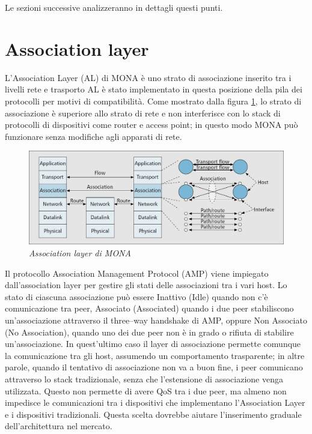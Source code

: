 \documentclass[12pt,a4paper,openright,twoside,draft]{book}
\begin{document}
Le sezioni successive analizzeranno in dettagli questi punti.

\section{Association layer}

L'Association Layer (AL) di MONA è uno strato di associazione inserito
tra i livelli rete e trasporto AL è stato implementato in questa
posizione della pila dei protocolli per motivi di compatibilità. Come
mostrato dalla figura \ref{fig:mona-association-layer}, lo strato di
associazione è superiore allo strato di rete e non interferisce con lo
stack di protocolli di dispositivi come router e access point; in
questo modo MONA può funzionare senza modifiche agli apparati di rete.

\begin{figure}
\centering
\includegraphics[width=\textwidth]{img/mona-association-layer}
\caption{\em Association layer di MONA}
\label{fig:mona-association-layer}
\end{figure}

Il protocollo Association Management Protocol (AMP) viene impiegato
dall'association layer per gestire gli stati delle associazioni tra i
vari host. Lo stato di ciascuna associazione può essere Inattivo
(Idle) quando non c'è comunicazione tra peer, Associato (Associated)
quando i due peer stabiliscono un'associazione attraverso il
three--way handshake di AMP, oppure Non Associato (No Association),
quando uno dei due peer non è in grado o rifiuta di stabilire
un'associazione. In quest'ultimo caso il layer di associazione
permette comunque la comunicazione tra gli host, assumendo un
comportamento trasparente; in altre parole, quando il tentativo di
associazione non va a buon fine, i peer comunicano attraverso lo stack
tradizionale, senza che l'estensione di associazione venga
utilizzata. Questo non permette di avere QoS tra i due peer, ma almeno
non impedisce le comunicazioni tra i dispositivi che implementano
l'Association Layer e i dispositivi tradizionali. Questa scelta
dovrebbe aiutare l'inserimento graduale dell'architettura nel mercato.
\end{document}
